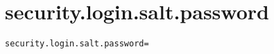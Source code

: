 \section{security.login.salt.password}
\label{configuration:SecurityLoginSaltPassword}
\AvailableInJavaOnly{\TODO}
\begin{lstlisting}[style=Props,caption={Usage example for \textit{security.login.salt.password}}]
security.login.salt.password=
\end{lstlisting}